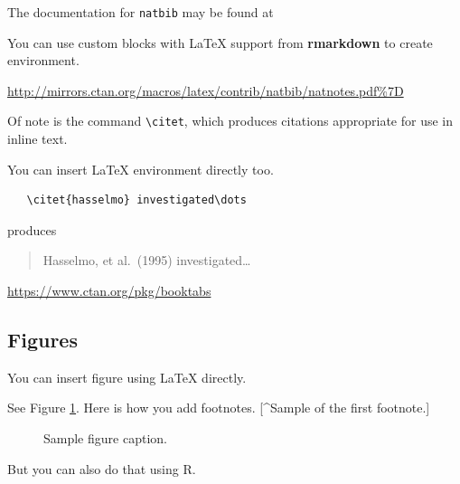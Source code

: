 \documentclass{article}
\newenvironment{Shaded}{\begin{snugshade}}{\end{snugshade}}
\newcommand{\FunctionTok}[1]{\textcolor[rgb]{0.00,0.00,0.00}{#1}}
\newcommand{\NormalTok}[1]{#1}
\newcommand{\SpecialCharTok}[1]{\textcolor[rgb]{0.00,0.00,0.00}{#1}}
\begin{document}
The documentation for \verb+natbib+ may be found at

You can use custom blocks with LaTeX support from \textbf{rmarkdown} to
create environment.

\begin{center}
\url{http://mirrors.ctan.org/macros/latex/contrib/natbib/natnotes.pdf\%7D}

\end{center}

Of note is the command \verb+\citet+, which produces citations
appropriate for use in inline text.

You can insert LaTeX environment directly too.

\begin{verbatim}
   \citet{hasselmo} investigated\dots
\end{verbatim}

produces

\begin{quote}
  Hasselmo, et al.\ (1995) investigated\dots
\end{quote}

\begin{center}
  \url{https://www.ctan.org/pkg/booktabs}
\end{center}

\hypertarget{figures}{%
\subsection{Figures}\label{figures}}

You can insert figure using LaTeX directly.

See Figure \ref{fig:fig1}. Here is how you add footnotes. {[}\^{}Sample
of the first footnote.{]}

\begin{figure}
  \centering
  \fbox{\rule[-.5cm]{4cm}{4cm} \rule[-.5cm]{4cm}{0cm}}
  \caption{Sample figure caption.}
  \label{fig:fig1}
\end{figure}

But you can also do that using R.

\begin{Shaded}
\end{Shaded}
\end{document}

